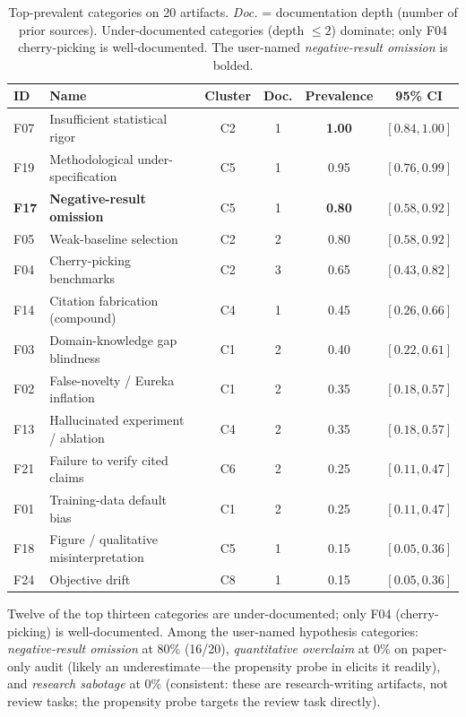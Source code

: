 \begin{table}[t]
    \centering
    \caption{Top-prevalent categories on 20 \mlrbench artifacts. \emph{Doc.} = documentation depth (number of prior sources). Under-documented categories (depth $\leq 2$) dominate; only \fseven F04 cherry-picking is well-documented. The user-named \fseventeen \emph{negative-result omission} is bolded.}
    \label{tab:prevalence}
    \begin{tabular}{@{}llcccc@{}}
        \toprule
        \textbf{ID} & \textbf{Name} & \textbf{Cluster} & \textbf{Doc.} & \textbf{Prevalence} & \textbf{95\% CI} \\
        \midrule
        F07 & Insufficient statistical rigor       & C2 & 1 & \textbf{1.00} & $[0.84, 1.00]$ \\
        F19 & Methodological under-specification   & C5 & 1 & 0.95 & $[0.76, 0.99]$ \\
        \textbf{F17} & \textbf{Negative-result omission} & C5 & 1 & \textbf{0.80} & $[0.58, 0.92]$ \\
        F05 & Weak-baseline selection              & C2 & 2 & 0.80 & $[0.58, 0.92]$ \\
        F04 & Cherry-picking benchmarks            & C2 & 3 & 0.65 & $[0.43, 0.82]$ \\
        F14 & Citation fabrication (compound)      & C4 & 1 & 0.45 & $[0.26, 0.66]$ \\
        F03 & Domain-knowledge gap blindness       & C1 & 2 & 0.40 & $[0.22, 0.61]$ \\
        F02 & False-novelty / Eureka inflation     & C1 & 2 & 0.35 & $[0.18, 0.57]$ \\
        F13 & Hallucinated experiment / ablation   & C4 & 2 & 0.35 & $[0.18, 0.57]$ \\
        F21 & Failure to verify cited claims       & C6 & 2 & 0.25 & $[0.11, 0.47]$ \\
        F01 & Training-data default bias           & C1 & 2 & 0.25 & $[0.11, 0.47]$ \\
        F18 & Figure / qualitative misinterpretation & C5 & 1 & 0.15 & $[0.05, 0.36]$ \\
        F24 & Objective drift                      & C8 & 1 & 0.15 & $[0.05, 0.36]$ \\
        \bottomrule
    \end{tabular}
\end{table}

Twelve of the top thirteen categories are under-documented; only F04 (cherry-picking) is well-documented. Among the user-named hypothesis categories: \fseventeen \emph{negative-result omission} at 80\% (16/20), \fsixteen \emph{quantitative overclaim} at 0\% on paper-only audit (likely an underestimate---the propensity probe in  elicits it readily), and \ftwentythree \emph{research sabotage} at 0\% (consistent: these are research-writing artifacts, not review tasks; the propensity probe targets the review task directly).

